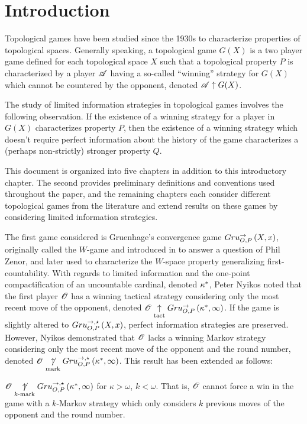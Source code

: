
\chapter{Introduction}

Topological games have been studied since the 1930s to characterize
properties of topological spaces. Generally speaking, a topological game $G(X)$
is a two player game defined for each topological space $X$ such that a
topological property $P$ is characterized by a player $\mathscr{A}$
having a so-called ``winning'' strategy for $G(X)$ which cannot be countered
by the opponent, denoted $\mathscr{A}\uparrow G(X)$.

The study of limited information strategies in topological games involves
the following observation. If the existence of a winning strategy for a player
in $G(X)$ characterizes property $P$, then the existence of a winning strategy
which doesn't require perfect information about the history of the game
characterizes a (perhaps non-strictly) stronger property $Q$.

This document is organized into five chapters in addition to this introductory
chapter. The second provides preliminary definitions and conventions used
throughout the paper, and the remaining chapters each consider different
topological games from the literature and extend results on these games
by considering limited information strategies.

The first game considered is Gruenhage's convergence game $Gru_{O,P}^{\to}\left({X},{x}\right)$,
originally called the $W$-game and introduced in \cite{MR0428275} to
answer a question of Phil Zenor, and later used to characterize the $W$-space
property generalizing first-countability. With regards to limited information
and the one-point compactification of an uncountable cardinal, denoted
$\kappa^*$, Peter Nyikos
noted that the first player $\mathscr{O}$ has a winning tactical strategy considering
only the most recent move of the opponent, denoted
$\mathscr{O}\underset{\text{tact}}{\uparrow}Gru_{O,P}^{\to}\left({\kappa^*},{\infty}\right)$. If the game is
slightly altered to $Gru_{O,P}^{\to,\star}\left({X},{x}\right)$, perfect information strategies are
preserved. However, Nyikos demonstrated that $\mathscr{O}$ lacks a winning Markov
strategy considering only the most recent move of the opponent and the round
number, denoted $\mathscr{O}\underset{\text{mark}}{\not\uparrow}Gru_{O,P}^{\to,\star}\left({\kappa^*},{\infty}\right)$.
This result has been extended as follows:

\begin{thm*}
  $\mathscr{O}\underset{k\text{-mark}}{\not\uparrow}Gru_{O,P}^{\to,\star}\left({\kappa^*},{\infty}\right)$ for
  $\kappa>\omega$, $k<\omega$.
  That is, $\mathscr{O}$ cannot force a win in the game with a $k$-Markov strategy
  which only considers $k$ previous moves of the opponent and the round number.
\end{thm*}

